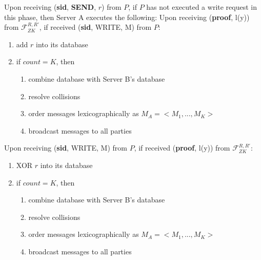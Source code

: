 \begin{tcolorbox}[colback=white, arc=5pt]
\extitem Upon receiving (\textbf{sid}, \textbf{SEND}, $r$) from $P$, if $P$ has not executed a write request in this phase, then
    Server A executes the following:
    Upon receiving (\textbf{proof}, l(y)) from $\mathcal{F}_{ZK}^{R,R'}$, if received (\textbf{sid}, WRITE, M) from $P$:
        \begin{enumerate}
            \item add $r$ into its database
            \item if $count=K$, then
            \begin{enumerate}
                \item combine database with Server B's database
                \item resolve collisions
                \item order messages lexicographically as $M_A=<M_1,...,M_K>$
                \item broadcast messages to all parties
            \end{enumerate}
        \end{enumerate}
    Upon receiving (\textbf{sid}, WRITE, M) from $P$, if received (\textbf{proof}, l(y)) from $\mathcal{F}_{ZK}^{R,R'}$:
        \begin{enumerate}
            \item XOR $r$ into its database
            \item if $count=K$, then
            \begin{enumerate}
                \item combine database with Server B's database
                \item resolve collisions
                \item order messages lexicographically as $M_A=<M_1,...,M_K>$
                \item broadcast messages to all parties
            \end{enumerate}
        \end{enumerate}
\end{tcolorbox}

\label{fig:riposte_protocol}